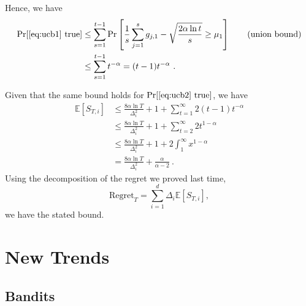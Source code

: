 \documentclass{beamer}
\begin{document}
\begin{frame}
Hence, we have
\begin{align*}
\Pr[\eqref{eq:ucb1} \text{ true} ]
&\leq \sum_{s=1}^{t-1} \Pr\left[\frac{1}{s}\sum_{j=1}^s g_{j,1} - \sqrt{\frac{2\alpha \ln t}{s}} \geq \mu_1\right] \qquad \text{(union bound)}\\
&\leq \sum_{s=1}^{t-1} t^{-\alpha} 
= (t-1) t^{-\alpha}~.
\end{align*}
\end{frame}


\begin{frame}
Given that the same bound holds for $\Pr[\eqref{eq:ucb2} \text{ true}]$, we have
\begin{align*}
\mathbb{E}\left[ S_{T,i}\right] 
&\leq \frac{8\alpha \ln T}{\Delta_i^2} + 1 + \sum_{t=1}^{\infty} 2 (t-1) t^{-\alpha} \\
&\leq \frac{8\alpha \ln T}{\Delta_i^2} + 1 + \sum_{t=2}^{\infty} 2 t^{1-\alpha} \\
&\leq \frac{8\alpha \ln T}{\Delta_i^2} + 1 + 2\int_{1}^{\infty} x^{1-\alpha}\\
&=\frac{8\alpha \ln T}{\Delta_i^2} + \frac{\alpha}{\alpha-2}~.
\end{align*}
Using the decomposition of the regret we proved last time, $$\mathrm{Regret}_T=\sum_{i=1}^d \Delta_i \mathbb{E}[S_{T,i}],$$ we have the stated bound.
\end{frame}

\section{New Trends}

\frame{\sectionpage}

\subsection{Bandits}
\frame{\subsectionpage}
\end{document}

